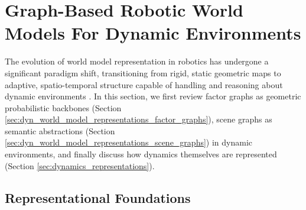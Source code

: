 \section{Graph-Based Robotic World Models For Dynamic Environments}\label{sec:dyn_world_model_representations}
The evolution of world model representation in robotics has undergone a significant paradigm shift, transitioning from rigid, static geometric maps to adaptive, spatio-temporal structure capable of handling and reasoning about dynamic environments \cite{bavle_slam_2023} \cite{rosinol_kimera_2021}.
In this section, we first review factor graphs as geometric probabilistic backbones (Section \ref{sec:dyn_world_model_representations_factor_graphs}), scene graphs as semantic abstractions (Section \ref{sec:dyn_world_model_representations_scene_graphs}) in dynamic environments, and finally discuss how dynamics themselves are represented (Section \ref{sec:dynamics_representations}).

\subsection{Representational Foundations}
